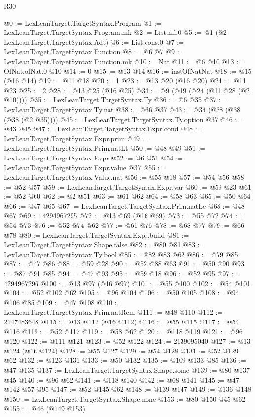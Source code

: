 \begin{lexlean}{R30}
\begin{coremodule}
@0 := LexLeanTarget.TargetSyntax.Program
@1 := LexLeanTarget.TargetSyntax.Program.mk
@2 := List.nil.{0}
@5 := @1 (@2 LexLeanTarget.TargetSyntax.Adt)
@6 := List.cons.{0}
@7 := LexLeanTarget.TargetSyntax.Function
@8 := @6 @7
@9 := LexLeanTarget.TargetSyntax.Function.mk
@10 := Nat
@11 := @6 @10
@13 := OfNat.ofNat.{0} @10
@14 := 0
@15 := @13 @14
@16 := instOfNatNat
@18 := @15 (@16 @14)
@19 := @11 @18
@20 := 1
@23 := @13 @20 (@16 @20)
@24 := @11 @23
@25 := 2
@28 := @13 @25 (@16 @25)
@34 := @9 (@19 (@24 (@11 @28 (@2 @10))))
@35 := LexLeanTarget.TargetSyntax.Ty
@36 := @6 @35
@37 := LexLeanTarget.TargetSyntax.Ty.nat
@38 := @36 @37
@43 := @34 (@38 (@38 (@38 (@2 @35))))
@45 := LexLeanTarget.TargetSyntax.Ty.option @37
@46 := @43 @45
@47 := LexLeanTarget.TargetSyntax.Expr.cond
@48 := LexLeanTarget.TargetSyntax.Expr.prim
@49 := LexLeanTarget.TargetSyntax.Prim.natLt
@50 := @48 @49
@51 := LexLeanTarget.TargetSyntax.Expr
@52 := @6 @51
@54 := LexLeanTarget.TargetSyntax.Expr.value @37
@55 := LexLeanTarget.TargetSyntax.Value.nat
@56 := @55 @18
@57 := @54 @56
@58 := @52 @57
@59 := LexLeanTarget.TargetSyntax.Expr.var
@60 := @59 @23
@61 := @52 @60
@62 := @2 @51
@63 := @61 @62
@64 := @58 @63
@65 := @50 @64
@66 := @47 @65
@67 := LexLeanTarget.TargetSyntax.Prim.natLe
@68 := @48 @67
@69 := 4294967295
@72 := @13 @69 (@16 @69)
@73 := @55 @72
@74 := @54 @73
@76 := @52 @74 @62
@77 := @61 @76
@78 := @68 @77
@79 := @66 @78
@80 := LexLeanTarget.TargetSyntax.Expr.build
@81 := LexLeanTarget.TargetSyntax.Shape.false
@82 := @80 @81
@83 := LexLeanTarget.TargetSyntax.Ty.bool
@85 := @82 @83 @62
@86 := @79 @85
@87 := @47 @86
@88 := @59 @28
@90 := @52 @88 @63
@91 := @50 @90
@93 := @87 @91 @85
@94 := @47 @93
@95 := @59 @18
@96 := @52 @95
@97 := 4294967296
@100 := @13 @97 (@16 @97)
@101 := @55 @100
@102 := @54 @101
@104 := @52 @102 @62
@105 := @96 @104
@106 := @50 @105
@108 := @94 @106 @85
@109 := @47 @108
@110 := LexLeanTarget.TargetSyntax.Prim.natRem
@111 := @48 @110
@112 := 2147483648
@115 := @13 @112 (@16 @112)
@116 := @55 @115
@117 := @54 @116
@118 := @52 @117
@119 := @58 @62
@120 := @118 @119
@121 := @96 @120
@122 := @111 @121
@123 := @52 @122
@124 := 2139095040
@127 := @13 @124 (@16 @124)
@128 := @55 @127
@129 := @54 @128
@131 := @52 @129 @62
@132 := @123 @131
@133 := @50 @132
@135 := @109 @133 @85
@136 := @47 @135
@137 := LexLeanTarget.TargetSyntax.Shape.some
@139 := @80 @137 @45
@140 := @96 @62
@141 := @118 @140
@142 := @68 @141
@145 := @47 @142 @57 @95
@147 := @52 @145 @62
@148 := @139 @147
@149 := @136 @148
@150 := LexLeanTarget.TargetSyntax.Shape.none
@153 := @80 @150 @45 @62
@155 := @46 (@149 @153)

\end{coremodule}
\end{lexlean}
